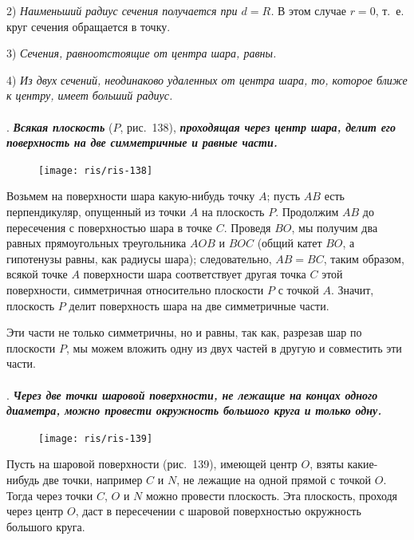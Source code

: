\documentclass[twoside]{book}
\begin{document}
2) \emph{Наименьший радиус сечения получается при $d=R$.}
В этом случае $r=0$, т.~е. круг сечения обращается в точку.

3) \emph{Сечения, равноотстоящие от центра шара, равны.}

4) \emph{Из двух сечений, неодинаково удаленных от центра шара, то, которое ближе к центру, имеет больший радиус.}

\paragraph{}\label{1938/s128}
.
\textbf{\emph{Всякая плоскость}} ($P$, рис.~138), \textbf{\emph{проходящая через центр шара, делит его поверхность на две симметричные и равные части.}}

\begin{figure}[h!]
\centering
\texttt{[image: ris/ris-138]}
\caption{}
\end{figure}

Возьмем на поверхности шара какую-нибудь точку $A$;
пусть $AB$ есть перпендикуляр, опущенный из точки $A$ на плоскость $P$.
Продолжим $AB$ до пересечения с поверхностью шара в точке $C$.
Проведя $BO$, мы получим два равных прямоугольных треугольника $AOB$ и $BOC$ (общий катет $BO$, а гипотенузы равны, как радиусы шара);
следовательно, $AB=BC$, таким образом, всякой точке $A$ поверхности шара соответствует другая точка $C$ этой поверхности, симметричная относительно плоскости $P$ с точкой $A$.
Значит, плоскость $P$ делит поверхность шара на две симметричные части.

Эти части не только симметричны, но и равны, так как, разрезав шар по плоскости $P$, мы можем вложить одну из двух частей в другую и совместить эти части. %

\paragraph{}\label{1938/s129}
.
\textbf{\emph{Через две точки шаровой поверхности, не лежащие на концах одного диаметра, можно провести окружность большого круга и только одну.}}

\begin{figure}[h!]
\centering
\texttt{[image: ris/ris-139]}
\caption{}
\end{figure}

Пусть на шаровой поверхности (рис.~139), имеющей центр $O$, взяты какие-нибудь две точки, например $C$ и $N$, не лежащие на одной прямой с точкой $O$.
Тогда через точки $C$, $O$ и $N$ можно провести плоскость.
Эта плоскость, проходя через центр $O$, даст в пересечении с шаровой поверхностью окружность большого круга.
\end{document}
